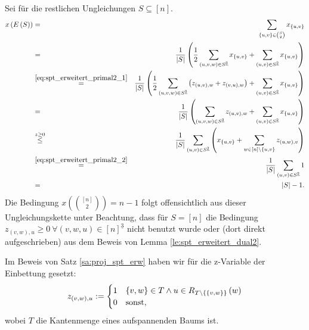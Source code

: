 \documentclass[10p,a4paper,BCOR = 12mm, DIV=15]{scrbook}
\begin{document}
{\begin{bew}
Sei für die restlichen Ungleichungen $S\subseteq \left[n\right]$.
{
\allowdisplaybreaks
\begin{eqnarray*}
x\left(E\left(S\right)\right) & = & \sum_{\left\{u, v\right\} \in {S \choose 2}} x_{\left\{u, v\right\}} \\
& = & \frac{1}{\left|S\right|} \left(\frac{1}{2} \sum_{\left(u, v, w\right) \in S^{\underline{3}}} x_{\left\{u, v\right\}} + \sum_{\left(u, v\right) \in S^{\underline{2}}} x_{\left\{u, v\right\}} \right) \\
& \stackrel{\eqref{eq:spt_erweitert_primal2_1}}{=} & \frac{1}{\left|S\right|} \left(\frac{1}{2} \sum_{\left(u, v, w\right) \in S^{\underline{3}}} \left(z_{\left(u, v\right), w} + z_{\left(v, u\right), w}\right) + \sum_{\left(u, v\right) \in S^{\underline{2}}} x_{\left\{u, v\right\}} \right) \\
& = & \frac{1}{\left|S\right|} \left(\sum_{\left(u, v, w\right) \in S^{\underline{3}}} z_{\left(u, v\right), w} + \sum_{\left(u, v\right) \in S^{\underline{2}}} x_{\left\{u, v\right\}} \right) \\
& \stackrel{z \geq 0}{\leq} & \frac{1}{\left|S\right|} \sum_{\left(u, v\right) \in S^{\underline{2}}} \left( x_{\left\{u, v\right\}} + \sum_{w \in \left[n\right] \backslash \left\{u, v\right\}} z_{\left(u, w\right), v} 
\right) \\
& \stackrel{\eqref{eq:spt_erweitert_primal2_2}}{=} & \frac{1}{\left|S\right|} \sum_{\left(u, v\right) \in S^{\underline{2}}} 1 \\
& = & \left|S\right|-1.
\end{eqnarray*}
}
Die Bedingung $x\left({\left[n\right] \choose 2}\right) = n-1$ folgt offensichtlich aus dieser Ungleichungskette unter Beachtung, dass für $S=\left[n\right]$ die Bedingung $z_{\left(v, w\right), u} \geq 0 \ \forall \left(v, w, u\right) \in \left[n\right]^{\underline{3}}$ nicht benutzt wurde oder (dort direkt aufgeschrieben) aus dem Beweis von Lemma \ref{le:spt_erweitert_dual2}.
\end{bew}

\begin{Bem}
Im Beweis von Satz \ref{sa:proj_spt_erw} haben wir für die z-Variable der Einbettung gesetzt:
\begin{displaymath}
z_{\left(v, w\right), u} := \begin{cases}
1 & \left\{v, w\right\}\in T\wedge u\in R_{T\backslash \left\{\left\{v, w\right\}\right\}}\left(w\right) \\
0 & \textnormal{sonst,}
\end{cases}
\end{displaymath}
wobei $T$ die Kantenmenge eines aufspannenden Baums ist.


\end{Bem}}
\end{document}
